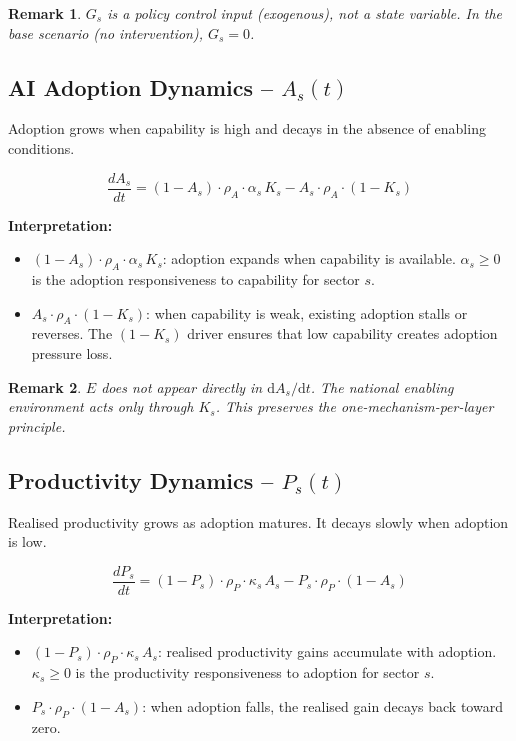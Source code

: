 \documentclass[11pt,a4paper]{article}
\newtheorem{remark}{Remark}
\begin{document}
\begin{remark}
$G_s$ is a policy control input (exogenous), not a state variable. In the base scenario (no intervention), $G_s = 0$.
\end{remark}

\subsection{AI Adoption Dynamics -- \texorpdfstring{$A_s(t)$}{As(t)}}

Adoption grows when capability is high and decays in the absence of enabling conditions.

\begin{equation}
\boxed{
\frac{dA_s}{dt}
= (1 - A_s)\cdot\rho_A\cdot\alpha_s\, K_s
- A_s\cdot\rho_A\cdot(1 - K_s)
}
\label{eq:As}
\end{equation}

\textbf{Interpretation:}
\begin{itemize}
  \item $(1 - A_s)\cdot\rho_A\cdot\alpha_s\, K_s$: adoption expands when capability is available. $\alpha_s \geq 0$ is the adoption responsiveness to capability for sector $s$.
  \item $A_s\cdot\rho_A\cdot(1 - K_s)$: when capability is weak, existing adoption stalls or reverses. The $(1 - K_s)$ driver ensures that low capability creates adoption pressure loss.
\end{itemize}

\begin{remark}
$E$ does not appear directly in $\mathrm{d}A_s/\mathrm{d}t$. The national enabling environment acts \emph{only through} $K_s$. This preserves the one-mechanism-per-layer principle.
\end{remark}

\subsection{Productivity Dynamics -- \texorpdfstring{$P_s(t)$}{Ps(t)}}

Realised productivity grows as adoption matures. It decays slowly when adoption is low.

\begin{equation}
\boxed{
\frac{dP_s}{dt}
= (1 - P_s)\cdot\rho_P\cdot\kappa_s\, A_s
- P_s\cdot\rho_P\cdot(1 - A_s)
}
\label{eq:Ps}
\end{equation}

\textbf{Interpretation:}
\begin{itemize}
  \item $(1 - P_s)\cdot\rho_P\cdot\kappa_s\, A_s$: realised productivity gains accumulate with adoption. $\kappa_s \geq 0$ is the productivity responsiveness to adoption for sector $s$.
  \item $P_s\cdot\rho_P\cdot(1 - A_s)$: when adoption falls, the realised gain decays back toward zero.
\end{itemize}
\end{document}
